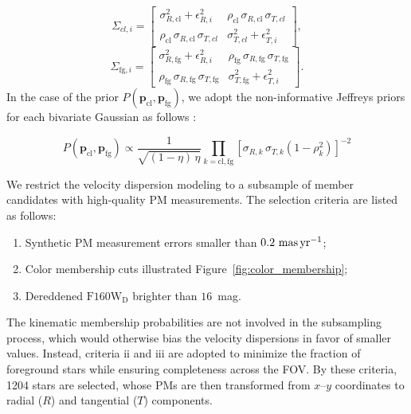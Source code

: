 \documentclass[12pt]{ucsddissertation}
\begin{document}
\begin{CJK*}{UTF8}{gbsn}
\begin{equation}
\Sigma_{cl, i} = \begin{bmatrix} \sigma_{R, \mathrm{cl}}^2 + \epsilon_{R, i}^2 & \rho_\mathrm{cl}\,\sigma_{R, \mathrm{cl}}\,\sigma_{T, cl}\\ \rho_\mathrm{cl}\,\sigma_{R, \mathrm{cl}}\,\sigma_{T, cl} & \sigma_{T, cl}^2 + \epsilon_{T, i}^2 \end{bmatrix},
\end{equation}
\begin{equation}
\Sigma_{\mathrm{fg}, i} = \begin{bmatrix} \sigma_{R, \mathrm{fg}}^2 + \epsilon_{R, i}^2 & \rho_\mathrm{fg}\,\sigma_{R, \mathrm{fg}}\,\sigma_{T, \mathrm{fg}}\\ \rho_\mathrm{fg}\,\sigma_{R, \mathrm{fg}}\,\sigma_{T, \mathrm{fg}} & \sigma_{T, \mathrm{fg}}^2 + \epsilon_{T, i}^2 \end{bmatrix}.
\end{equation}
In the case of the prior $P(\boldsymbol{p_\mathrm{cl}}, \boldsymbol{p_\mathrm{fg}})$, we adopt the non-informative Jeffreys priors for each bivariate Gaussian as follows \citep{Berger-2008, Bernardo-1988}:

\begin{equation}
P(\boldsymbol{p_\mathrm{cl}}, \boldsymbol{p_\mathrm{fg}}) \propto \frac{1}{\sqrt{(1-\eta)\,\eta}} \prod_{k=\mathrm{cl}, \mathrm{fg}}\left[\sigma_{R, k}\,\sigma_{T, k}\left(1-\rho_{k}^2\right)\right]^{-2}
\end{equation}

We restrict the velocity dispersion modeling to a subsample of member candidates with high-quality PM measurements. The selection criteria are listed as follows:
\begin{enumerate}[leftmargin=*, label=\roman*., align=left, labelsep=0em, itemsep=0em]
    \item Synthetic PM measurement errors smaller than $0.2~\rm mas\,yr^{-1}$;
    \item Color membership cuts illustrated Figure~\ref{fig:color_membership};
    \item Dereddened $\mathrm{F160W_D}$ brighter than  $16$~mag.
\end{enumerate}
The kinematic membership probabilities are not involved in the subsampling process, which would otherwise bias the velocity dispersions in favor of smaller values. Instead, criteria ii and iii are adopted to minimize the fraction of foreground stars while ensuring completeness across the FOV. By these criteria, \num{1204} stars are selected, whose PMs are then transformed from $x$--$y$ coordinates to radial ($R$) and tangential ($T$) components.


\end{CJK*}
\end{document}
